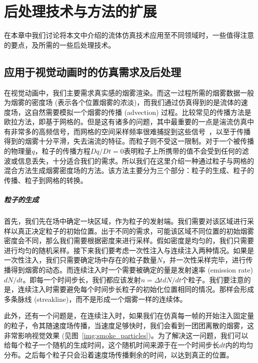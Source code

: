 \chapter{后处理技术与方法的扩展}
\label{chap:caa}

在本章中我们讨论将本文中介绍的流体仿真技术应用至不同领域时，一些值得注意的要点，及所需的一些后处理技术。

\section{应用于视觉动画时的仿真需求及后处理}
在视觉动画中，我们主要需求真实感的烟雾渲染。而这一过程所需的烟雾数据一般为烟雾的密度场 (表示各个位置烟雾的浓淡)，而我们通过仿真得到的是流体的速度场，这自然需要模拟一个烟雾的传播 (advection) 过程。比较常见的传播方法是欧拉方法，即基于网格的。但是这有诸多的问题，其中最重要的一点是湍流仿真中有非常多的高频信号，而网格的空间采样频率很难捕捉到这些信号~\cite{bridson2015fluid}，以至于传播得到的烟雾十分平滑，失去湍流的特征。而粒子则不受这一限制。对于一个被传播的物理量$q$，粒子的传播方程$Dq/Dt=0$表明粒子上所携带的值不会受到任何的滤波或信息丢失，十分适合我们的需求。所以我们在这里介绍一种通过粒子与网格的混合方法生成烟雾密度场的方法。该方法主要分为三个部分：粒子的生成、粒子的传播、粒子到网格的转换。

\paragraph{粒子的生成}
首先，我们先在场中确定一块区域，作为粒子的发射端。我们需要对该区域进行采样以真正决定粒子的初始位置。出于不同的需求，可能该区域不同位置的初始烟雾密度会不同，那么我们需要根据密度来进行采样。假如密度是均匀的，我们只需要进行均匀的随机采样。接下来我们要考虑一次性注入与连续注入两种情况。如果是一次性注入，我们只需要确定场中存在的粒子数量$N$，并一次性采样完毕，进行传播得到烟雾的动态。而连续注入时一个需要被确定的量是发射速率 (emission rate) $dN/dt$。即每一个时间步长，我们都应该发射$n=\Delta t dN/dt$个粒子。我们要注意的是，连续注入时需要避免每个时间步长粒子的初始化位置相同的情况。那样会形成多条脉线 (streakline)，而不是形成一个烟雾一样的连续体。

此外，还有一个问题是，在连续注入时，如果我们在仿真每一帧的开始注入固定量的粒子，令其随速度场传播，当速度足够快时，我们会看到一团团离散的烟雾，这非常影响视觉效果 (见图~\ref{img:smoke_particles})。为了解决这一问题，我们可以给每个粒子一个随机的生成时间，这个随机时间来源于在一个时间步长$dt$内的均匀分布。之后每个粒子只会沿着速度场传播剩余的时间，以达到真正的位置。

